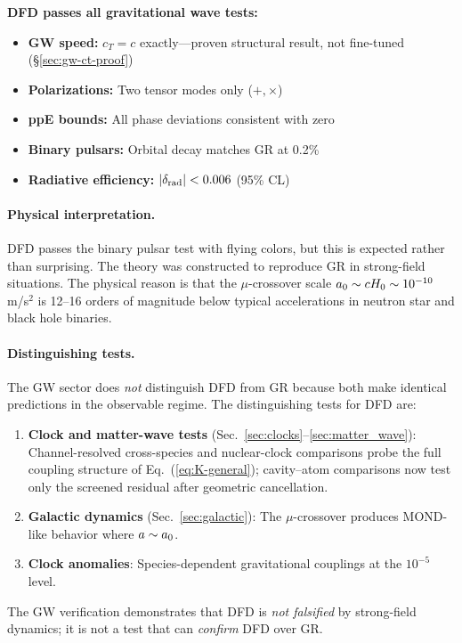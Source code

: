 \begin{tcolorbox}[colback=blue!5!white, colframe=blue!50!black, title=Summary: Gravitational Wave Tests]
\textbf{DFD passes all gravitational wave tests:}
\begin{itemize}
\item \textbf{GW speed:} $c_T = c$ exactly---proven structural result, not fine-tuned (\S\ref{sec:gw-ct-proof})
\item \textbf{Polarizations:} Two tensor modes only ($+, \times$)
\item \textbf{ppE bounds:} All phase deviations consistent with zero
\item \textbf{Binary pulsars:} Orbital decay matches GR at 0.2\%
\item \textbf{Radiative efficiency:} $|\delta_{\rm rad}| < 0.006$ (95\% CL)
\end{itemize}
\end{tcolorbox}

\paragraph{Physical interpretation.}
DFD passes the binary pulsar test with flying colors, but this is expected rather than surprising. The theory was constructed to reproduce GR in strong-field situations. The physical reason is that the $\mu$-crossover scale $a_0 \sim cH_0 \sim 10^{-10}$ m/s$^2$ is 12--16 orders of magnitude below typical accelerations in neutron star and black hole binaries.

\paragraph{Distinguishing tests.}
The GW sector does \textit{not} distinguish DFD from GR because both make identical predictions in the observable regime. The distinguishing tests for DFD are:

\begin{enumerate}
\item \textbf{Clock and matter-wave tests} (Sec.~\ref{sec:clocks}--\ref{sec:matter_wave}): Channel-resolved cross-species and nuclear-clock comparisons probe the full coupling structure of Eq.~(\ref{eq:K-general}); cavity--atom comparisons now test only the screened residual after geometric cancellation.

\item \textbf{Galactic dynamics} (Sec.~\ref{sec:galactic}): The $\mu$-crossover produces MOND-like behavior where $a \sim a_0$.

\item \textbf{Clock anomalies}: Species-dependent gravitational couplings at the $10^{-5}$ level.
\end{enumerate}

The GW verification demonstrates that DFD is \textit{not falsified} by strong-field dynamics; it is not a test that can \textit{confirm} DFD over GR.
